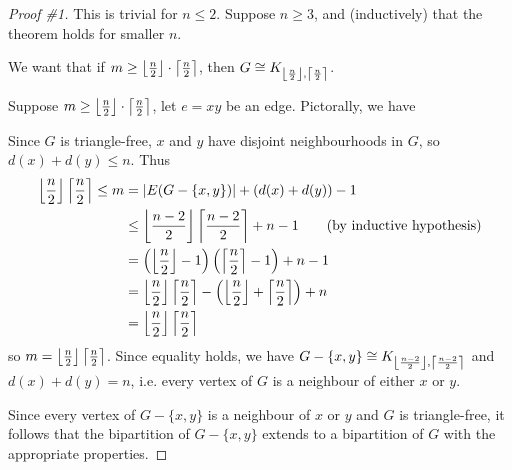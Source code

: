 \documentclass[main.tex]{subfiles}
\begin{document}
\begin{proof}[Proof \#1]
  This is trivial for $n\leq 2$.
  Suppose $n\geq 3$, and (inductively) that the theorem holds for smaller $n$.

  We want that if $m\geq\left\lfloor \frac n 2 \right\rfloor\cdot\left\lceil \frac n 2 \right\rceil$,
  then $G\cong K_{\left\lfloor \frac n 2 \right\rfloor,\left\lceil \frac n 2 \right\rceil}$.

  Suppose $m\geq\left\lfloor \frac n 2 \right\rfloor\cdot\left\lceil \frac n 2 \right\rceil$, let $e = xy$ be an edge.
  Pictorally, we have
  \begin{center}
  \end{center}

  Since $G$ is triangle-free, $x$ and $y$ have disjoint neighbourhoods in $G$,
  so $d(x) + d(y)\leq n$.
  Thus
  \begin{align*}
    \left\lfloor \frac n 2 \right\rfloor\left\lceil \frac n 2 \right\rceil \leq m
    &= |E(G - \{x,y\})| + (d(x) + d(y)) - 1 \\
    &\leq \left\lfloor \frac{n-2}{2} \right\rfloor\left\lceil \frac{n-2}{2} \right\rceil + n - 1 \tag{by inductive hypothesis} \\
    &= \left(\left\lfloor \frac n 2 \right\rfloor-1\right)\left(\left\lceil \frac n 2 \right\rceil-1\right) + n - 1 \\
    &= \left\lfloor \frac n 2 \right\rfloor\left\lceil \frac n 2 \right\rceil - \left(\left\lfloor \frac n 2 \right\rfloor + \left\lceil \frac n 2 \right\rceil\right) + n \\
    &= \left\lfloor \frac n 2 \right\rfloor\left\lceil \frac n 2 \right\rceil
  \end{align*}
  so $m = \left\lfloor \frac n 2 \right\rfloor\left\lceil \frac n 2 \right\rceil$.
  Since equality holds, we have
  $G - \{x,y\}\cong K_{\left\lfloor \frac{n-2}{2} \right\rfloor,\left\lceil \frac{n-2}{2} \right\rceil}$ and
  $d(x) + d(y) = n$, i.e. every vertex of $G$ is a neighbour of either $x$ or $y$.

  Since every vertex of $G - \{x,y\}$ is a neighbour of $x$ or $y$ and $G$ is
  triangle-free, it follows that the bipartition of $G - \{x,y\}$ extends to
  a bipartition of $G$ with the appropriate properties.
\end{proof}
\end{document}
